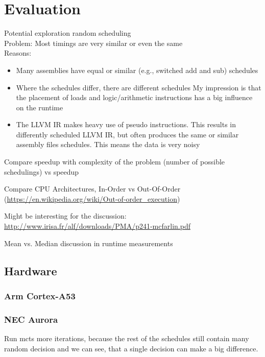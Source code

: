 \chapter{Evaluation}
\label{eval:svm}
Potential exploration \rightarrow random scheduling \\
Problem: Most timings are very similar or even the same \\
Reasons:
\begin{itemize}
    \item Many assemblies have equal or similar (e.g., switched add and sub) schedules
    \item Where the schedules differ, there are different schedules
    My impression is that the placement of loads and logic/arithmetic instructions has a big influence on the runtime
    \item The LLVM IR makes heavy use of pseudo instructions.
    This results in differently scheduled LLVM IR, but often produces the same or similar assembly files schedules.
    This means the data is very noisy
\end{itemize}

Compare speedup with complexity of the problem (number of possible schedulings) vs speedup

Compare CPU Architectures, In-Order vs Out-Of-Order (\url{https://en.wikipedia.org/wiki/Out-of-order_execution})

Might be interesting for the discussion: \url{http://www.irisa.fr/alf/downloads/PMA/p241-mcfarlin.pdf}

Mean vs. Median discussion in runtime measurements

\section{Hardware}
\subsection{Arm Cortex-A53}
\subsection{NEC Aurora}



Run \ac{mcts} more iterations, because the rest of the schedules still contain many random decision and we can see, that a single decision can make a big difference.
